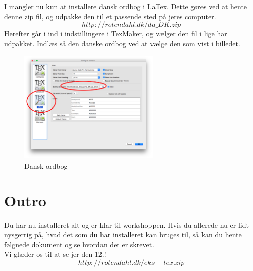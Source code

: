 \documentclass{article}                                                        %
\begin{document}
	I mangler nu kun at installere dansk ordbog i LaTex. 
	Dette gøres ved at hente denne zip fil, og udpakke den til et passende sted
	på jeres computer.
	$$
		http://rotendahl.dk/da\_DK.zip 
	$$		
	Herefter går i ind i indstillingere i TexMaker, og vælger den fil i 
	lige har udpakket. 
	Indlæs så den danske ordbog ved at vælge den som vist i billedet. 
	\begin{figure}[h!]
    	\caption{Dansk ordbog}
        \centering
        \includegraphics[width=0.6\textwidth]{./danish.png}
    \end{figure}
	
	\section{Outro}
	Du har nu installeret alt og er klar til workshoppen. 
	Hvis du allerede nu er lidt nysgerrig på, hvad det som du har installeret 
	kan bruges til, så kan du hente følgnede dokument og se hvordan det er skrevet.  \\ Vi glæder os til at se jer den 12.! 
		$$
		http://rotendahl.dk/eks-tex.zip 
	$$

   
\end{document}
